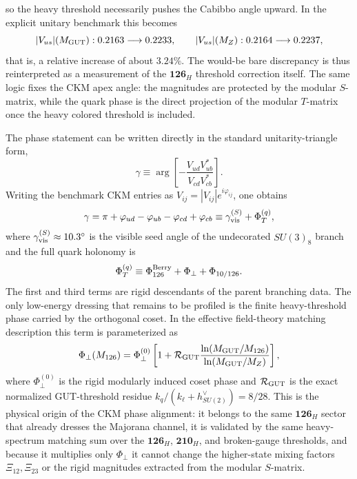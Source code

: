 \documentclass[11pt]{article}
\begin{document}
so the heavy threshold necessarily pushes the Cabibbo angle upward. In the explicit unitary benchmark this becomes
\begin{equation}
 |V_{us}|(M_{\rm GUT}): 0.2163 \longrightarrow 0.2233,
 \qquad
 |V_{us}|(M_Z): 0.2164 \longrightarrow 0.2237,
\end{equation}
that is, a relative increase of about $3.24\%$. The would-be bare discrepancy is thus reinterpreted as a measurement of the $\mathbf{126}_H$ threshold correction itself. The same logic fixes the CKM apex angle: the magnitudes are protected by the modular $S$-matrix, while the quark phase is the direct projection of the modular $T$-matrix once the heavy colored threshold is included.

The phase statement can be written directly in the standard unitarity-triangle form,
\begin{equation}
 \gamma
 \equiv
 \arg\!\left[-\frac{V_{ud}V_{ub}^{\ast}}{V_{cd}V_{cb}^{\ast}}\right].
\end{equation}
Writing the benchmark CKM entries as $V_{ij}=|V_{ij}|e^{i\varphi_{ij}}$, one obtains
\begin{equation}
 \gamma
 =
 \pi+\varphi_{ud}-\varphi_{ub}-\varphi_{cd}+\varphi_{cb}
 \equiv
 \gamma_{\rm vis}^{(S)}+\Phi_{T}^{(q)},
\end{equation}
where $\gamma_{\rm vis}^{(S)}\approx10.3^{\circ}$ is the visible seed angle of the undecorated $SU(3)_8$ branch and the full quark holonomy is
\begin{equation}
 \Phi_T^{(q)}
 \equiv
 \Phi_{126}^{\rm Berry}+\Phi_{\perp}+\Phi_{10/126}.
\end{equation}
The first and third terms are rigid descendants of the parent branching data. The only low-energy dressing that remains to be profiled is the finite heavy-threshold phase carried by the orthogonal coset. In the effective field-theory matching description this term is parameterized as
\begin{equation}
 \Phi_{\perp}(M_{126})
 =
 \Phi_{\perp}^{(0)}
 \left[1+\mathcal R_{\rm GUT}\frac{\ln(M_{\rm GUT}/M_{126})}{\ln(M_{\rm GUT}/M_Z)}\right],
\end{equation}
where $\Phi_{\perp}^{(0)}$ is the rigid modularly induced coset phase and $\mathcal R_{\rm GUT}$ is the exact normalized GUT-threshold residue $k_q/(k_{\ell}+h^{\vee}_{SU(2)})=8/28$. This is the physical origin of the CKM phase alignment: it belongs to the same $\mathbf{126}_H$ sector that already dresses the Majorana channel, it is validated by the same heavy-spectrum matching sum over the $\mathbf{126}_H$, $\mathbf{210}_H$, and broken-gauge thresholds, and because it multiplies only $\Phi_{\perp}$ it cannot change the higher-state mixing factors $\Xi_{12},\Xi_{23}$ or the rigid magnitudes extracted from the modular $S$-matrix.
\end{document}
